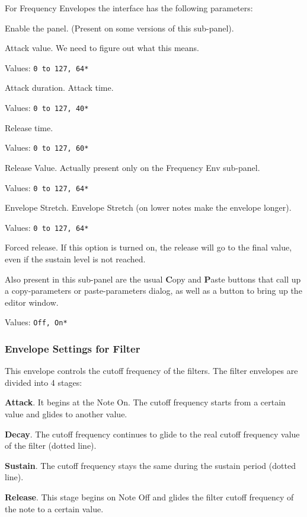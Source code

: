    For Frequency Envelopes the interface has the following parameters:

   \setcounter{ItemCounter}{0}      %

   Enable the panel.  (Present on some versions of this sub-panel).


   Attack value.
   We need to figure out what this means.

   Values: \texttt{0 to 127, 64*}

   Attack duration. Attack time.

   Values: \texttt{0 to 127, 40*}

   Release time.

   Values: \texttt{0 to 127, 60*}

   Release Value.
   Actually present only on the Frequency Env sub-panel.

   Values: \texttt{0 to 127, 64*}

   Envelope Stretch.
   Envelope Stretch (on lower notes make the envelope longer).

   Values: \texttt{0 to 127, 64*}

   Forced release.
   If this option is turned on, the release will go to the
   final value, even if the sustain level is not reached.

   Also present in this sub-panel are the usual \textbf{C}opy
   and \textbf{P}aste buttons that call up a copy-parameters or
   paste-parameters dialog, as well as a button
   to bring up the editor window.

   Values: \texttt{Off, On*}

\subsubsection{Envelope Settings for Filter}
\label{subsubsec:envelope_settings_for_filter}

   This envelope controls the cutoff frequency of the filters.
   The filter envelopes are divided into 4 stages:

   \begin{enumber}
      \item \textbf{Attack}.
         It begins at the Note On.
         The cutoff frequency starts from a certain value and glides to another
         value.
      \item \textbf{Decay}.
         The cutoff frequency continues to glide to the real cutoff frequency
         value of the filter (dotted line).
      \item \textbf{Sustain}.
         The cutoff frequency stays the same during the sustain period (dotted
         line).
      \item \textbf{Release}.
         This stage begins on Note Off and glides the filter cutoff frequency
         of the note to a certain value.
   \end{enumber}

